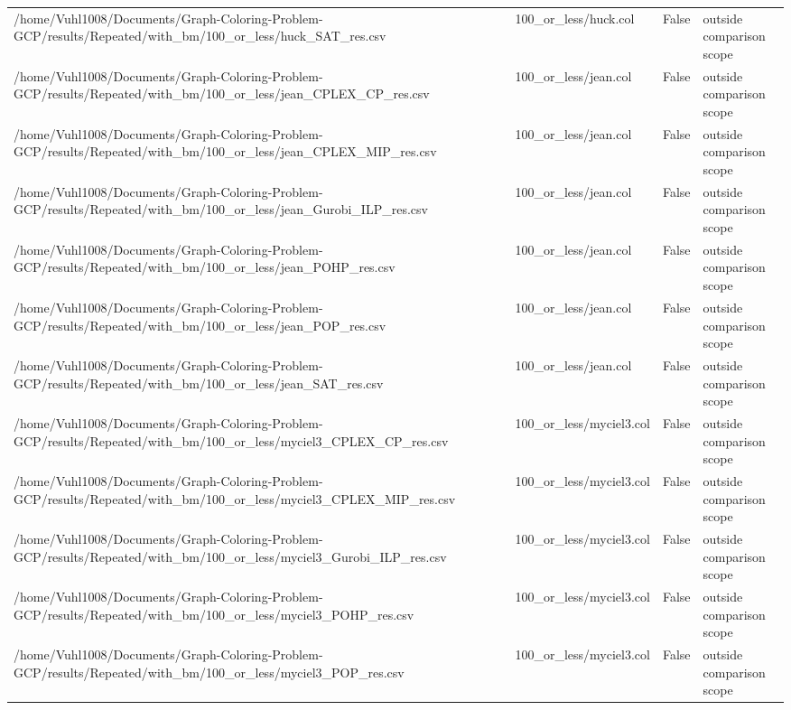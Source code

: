 \begin{table}[htbp]
\begin{tabular}{llll}
/home/Vuhl1008/Documents/Graph-Coloring-Problem-GCP/results/Repeated/with\_bm/100\_or\_less/huck\_SAT\_res.csv & 100\_or\_less/huck.col & False & outside comparison scope \\
/home/Vuhl1008/Documents/Graph-Coloring-Problem-GCP/results/Repeated/with\_bm/100\_or\_less/jean\_CPLEX\_CP\_res.csv & 100\_or\_less/jean.col & False & outside comparison scope \\
/home/Vuhl1008/Documents/Graph-Coloring-Problem-GCP/results/Repeated/with\_bm/100\_or\_less/jean\_CPLEX\_MIP\_res.csv & 100\_or\_less/jean.col & False & outside comparison scope \\
/home/Vuhl1008/Documents/Graph-Coloring-Problem-GCP/results/Repeated/with\_bm/100\_or\_less/jean\_Gurobi\_ILP\_res.csv & 100\_or\_less/jean.col & False & outside comparison scope \\
/home/Vuhl1008/Documents/Graph-Coloring-Problem-GCP/results/Repeated/with\_bm/100\_or\_less/jean\_POHP\_res.csv & 100\_or\_less/jean.col & False & outside comparison scope \\
/home/Vuhl1008/Documents/Graph-Coloring-Problem-GCP/results/Repeated/with\_bm/100\_or\_less/jean\_POP\_res.csv & 100\_or\_less/jean.col & False & outside comparison scope \\
/home/Vuhl1008/Documents/Graph-Coloring-Problem-GCP/results/Repeated/with\_bm/100\_or\_less/jean\_SAT\_res.csv & 100\_or\_less/jean.col & False & outside comparison scope \\
/home/Vuhl1008/Documents/Graph-Coloring-Problem-GCP/results/Repeated/with\_bm/100\_or\_less/myciel3\_CPLEX\_CP\_res.csv & 100\_or\_less/myciel3.col & False & outside comparison scope \\
/home/Vuhl1008/Documents/Graph-Coloring-Problem-GCP/results/Repeated/with\_bm/100\_or\_less/myciel3\_CPLEX\_MIP\_res.csv & 100\_or\_less/myciel3.col & False & outside comparison scope \\
/home/Vuhl1008/Documents/Graph-Coloring-Problem-GCP/results/Repeated/with\_bm/100\_or\_less/myciel3\_Gurobi\_ILP\_res.csv & 100\_or\_less/myciel3.col & False & outside comparison scope \\
/home/Vuhl1008/Documents/Graph-Coloring-Problem-GCP/results/Repeated/with\_bm/100\_or\_less/myciel3\_POHP\_res.csv & 100\_or\_less/myciel3.col & False & outside comparison scope \\
/home/Vuhl1008/Documents/Graph-Coloring-Problem-GCP/results/Repeated/with\_bm/100\_or\_less/myciel3\_POP\_res.csv & 100\_or\_less/myciel3.col & False & outside comparison scope \\

\end{tabular}
\end{table}
